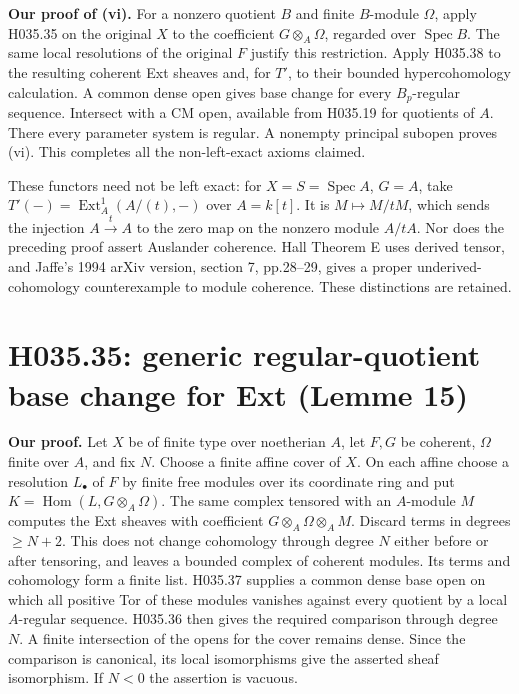 \textbf{Our proof of (vi).} For a nonzero quotient $B$ and finite
$B$-module $\Omega$, apply H035.35 on the original $X$ to the
coefficient $G\otimes_A\Omega$, regarded over $\operatorname{Spec}B$.
The same local resolutions of the original $F$ justify this restriction.
Apply H035.38 to the resulting coherent Ext sheaves and, for $T'$,
to their bounded hypercohomology calculation. A common dense open
gives base change for every $B_p$-regular sequence. Intersect with
a CM open, available from H035.19 for quotients of $A$. There
every parameter system is regular. A nonempty principal subopen
proves (vi). This completes all the non-left-exact axioms claimed.

These functors need not be left exact: for $X=S=\operatorname{Spec}A$,
$G=A$, take $T'(-)=\operatorname{Ext}^1_A(A/(t),-)$ over
$A=k[t]$. It is $M\mapsto M/tM$, which sends the injection
$A\xrightarrow{t}A$ to the zero map on the nonzero module $A/tA$.
Nor does the preceding proof assert Auslander coherence. Hall
Theorem E uses derived tensor, and Jaffe's 1994 arXiv version,
section 7, pp.28--29, gives a proper underived-cohomology
counterexample to module coherence. These distinctions are retained.

\section{H035.35: generic regular-quotient base change for Ext (Lemme 15)}
\textbf{Our proof.} Let $X$ be of finite type over noetherian $A$,
let $F,G$ be coherent, $\Omega$ finite over $A$, and fix $N$.
Choose a finite affine cover of $X$. On each affine choose a
resolution $L_\bullet$ of $F$ by finite free modules over its
coordinate ring and put $K=\operatorname{Hom}(L,G\otimes_A\Omega)$.
The same complex tensored with an $A$-module $M$ computes the
Ext sheaves with coefficient $G\otimes_A\Omega\otimes_A M$.
Discard terms in degrees $\geq N+2$. This does not change
cohomology through degree $N$ either before or after tensoring,
and leaves a bounded complex of coherent modules. Its terms and
cohomology form a finite list. H035.37 supplies a common dense
base open on which all positive Tor of these modules vanishes
against every quotient by a local $A$-regular sequence. H035.36
then gives the required comparison through degree $N$. A finite
intersection of the opens for the cover remains dense. Since the
comparison is canonical, its local isomorphisms give the asserted
sheaf isomorphism. If $N<0$ the assertion is vacuous.

